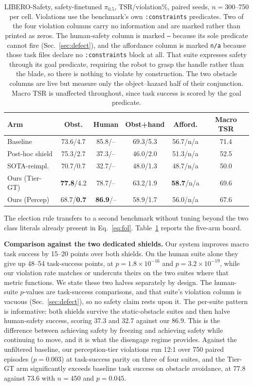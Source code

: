 \documentclass[conference]{IEEEtran}
\newcommand{\pifive}{$\pi_{0.5}$}
\begin{document}
\begin{table}[t]
\centering
\caption{LIBERO-Safety, safety-finetuned \pifive{}, TSR/violation\%, paired seeds, $n{=}300$--750 per cell. Violations use the benchmark's own \texttt{:constraints} predicates. Two of the four violation columns carry no information and are marked rather than printed as zeros. The human-safety column is marked \texttt{--} because its sole predicate cannot fire (Sec.~\ref{sec:defect}), and the affordance column is marked \texttt{n/a} because those task files declare no \texttt{:constraints} block at all. That suite expresses safety through its goal predicate, requiring the robot to grasp the handle rather than the blade, so there is nothing to violate by construction. The two obstacle columns are live but measure only the object--hazard half of their conjunction. Macro TSR is unaffected throughout, since task success is scored by the goal predicate.}
\label{tab:ls}
\setlength{\tabcolsep}{2pt}
\small
\begin{tabular}{lccccc}
\toprule
Arm & Obst. & Human & Obst+hand & Afford. & Macro TSR \\
\midrule
Baseline        & 73.6/4.7 & 85.8/-- & 69.3/5.3 & 56.7/n/a & 71.4 \\
Post-hoc shield & 75.3/2.7 & 37.3/-- & 46.0/2.0 & 51.3/n/a & 52.5 \\
SOTA-reimpl.    & 70.7/0.7 & 32.7/-- & 48.0/1.3 & 48.7/n/a & 50.0 \\
Ours (Tier-GT)  & \textbf{77.8}/4.2 & 78.7/-- & 63.2/1.9 & \textbf{58.7}/n/a & 69.6 \\
Ours (Percep)   & 68.7/\textbf{0.7} & \textbf{86.9}/-- & 58.9/1.7 & 56.0/n/a & 67.6 \\
\bottomrule
\end{tabular}
\end{table}

The election rule transfers to a second benchmark without tuning beyond the two class literals already present in Eq.~\eqref{eq:fol}. Table~\ref{tab:ls} reports the five-arm board.

\textbf{Comparison against the two dedicated shields.} Our system improves macro task success by 15--20 points over both shields. On the human suite alone they give up 48--54 task-success points, at $p=1.8\times10^{-16}$ and $p=3.2\times10^{-19}$, while our violation rate matches or undercuts theirs on the two suites where that metric functions. We state these two halves separately by design. The human-suite $p$-values are task-success comparisons, and that suite's violation column is vacuous (Sec.~\ref{sec:defect}), so no safety claim rests upon it. The per-suite pattern is informative: both shields survive the static-obstacle suites and then halve human-safety success, scoring 37.3 and 32.7 against our 86.9. This is the difference between achieving safety by freezing and achieving safety while continuing to move, and it is what the disengage regime provides. Against the unfiltered baseline, our perception-tier violations run 12:1 over 750 paired episodes ($p=0.003$) at task-success parity on three of four suites, and the Tier-GT arm significantly exceeds baseline task success on obstacle avoidance, at 77.8 against 73.6 with $n{=}450$ and $p=0.045$.
\end{document}
